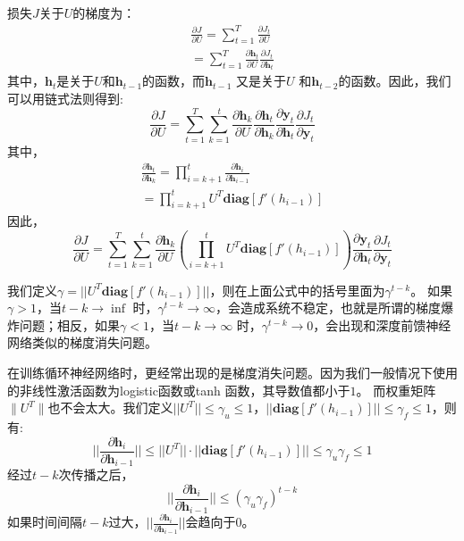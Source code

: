 \documentclass[11pt,fleqn, UTF8]{ctexbook} %
\begin{document}
损失$J$关于$U$的梯度为：
\begin{gather}\label{7.3}
  \frac{\partial J}{\partial U} =\sum_{t=1}^T\frac{\partial J_t}{\partial U}\\
  =\sum_{t=1}^T\frac{\partial \boldsymbol{h}_t}{\partial U}\frac{\partial J_t}{\partial \boldsymbol{h}_t}
\end{gather}
其中，$\boldsymbol{h}_t$是关于$U$和$\boldsymbol{h}_{t-1}$的函数，而$\boldsymbol{h}_{t-1}$ 又是关于$U$ 和$\boldsymbol{h}_{t-2}$的函数。因此，我们可以用链式法则得到:
\begin{equation}\label{7.5}
  \frac{\partial J}{\partial U} =\sum_{t=1}^{T}\sum_{k=1}^{t}\frac{\partial \boldsymbol{h}_k}{\partial U}\frac{\partial \boldsymbol{h}_t}{\partial \boldsymbol{h}_k}\frac{\partial \boldsymbol{y}_t}{\partial \boldsymbol{h}_t}\frac{\partial J_t}{\partial \boldsymbol{y}_t}
\end{equation}
其中，
\begin{gather}\label{7.6}
  \frac{\partial \boldsymbol{h}_t}{\partial \boldsymbol{h}_k}=\prod_{i=k+1}^{t}\frac{\partial \boldsymbol{h}_i}{\partial \boldsymbol{h}_{i-1}} \\
  =\prod_{i=k+1}^{t}U^T\boldsymbol{diag}[f'(h_{i-1})]
\end{gather}
因此，
\begin{equation}\label{7.8}
  \frac{\partial J}{\partial U} =\sum_{t=1}^{T}\sum_{k=1}^{t}\frac{\partial \boldsymbol{h}_k}{\partial U}  \left( \prod_{i=k+1}^{t}U^T\boldsymbol{diag}[f'(h_{i-1})] \right)    \frac{\partial \boldsymbol{y}_t}{\partial \boldsymbol{h}_t}\frac{\partial J_t}{\partial \boldsymbol{y}_t}
\end{equation}

我们定义$\gamma = ||U^T\boldsymbol{diag}[f'(h_{i-1})]||$，则在上面公式中的括号里面为$\gamma^{t-k}$。 如果$\gamma > 1$，当$t-k \to \inf$ 时，$\gamma^{t-k}\to \infty$，会造成系统不稳定，也就是所谓的梯度爆炸问题；相反，如果$\gamma < 1$，当$t-k \to \infty$ 时，$\gamma^{t-k}\to 0$，会出现和深度前馈神经网络类似的梯度消失问题。

在训练循环神经网络时，更经常出现的是梯度消失问题。因为我们一般情况下使用的非线性激活函数为logistic函数或tanh 函数，其导数值都小于$1$。 而权重矩阵$∥U^T∥$也不会太大。我们定义$||U^T|| \leq \gamma_u\leq 1$，$||\boldsymbol{diag}[f'(h_{i-1})]|| \leq \gamma_f\leq 1$，则有:
\begin{equation}\label{7.9}
  ||\frac{\partial \boldsymbol{h}_i}{\partial \boldsymbol{h}_{i-1}}||\leq ||U^T|| \cdot ||\boldsymbol{diag}[f'(h_{i-1})]|| \leq \gamma_u\gamma_f\leq 1
\end{equation}
经过$t - k$次传播之后，
\begin{equation}\label{7.10}
  ||\frac{\partial \boldsymbol{h}_i}{\partial \boldsymbol{h}_{i-1}}||\leq(\gamma_u\gamma_f)^{t-k}
\end{equation}
如果时间间隔$t - k$过大，$||\frac{\partial \boldsymbol{h}_i}{\partial \boldsymbol{h}_{i-1}}||$会趋向于0。
\end{document}

